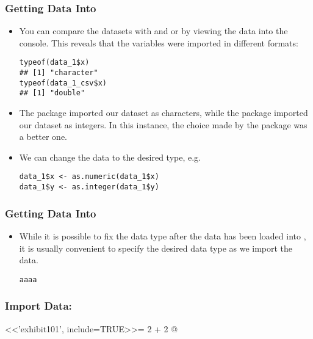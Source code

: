 \begin{frame}[fragile]%
\frametitle{Getting Data Into \Rlogo}
\begin{itemize}
\item You can compare the datasets with  and  or by viewing the data into the console. This reveals that the variables were imported in different formats:
\begin{lstlisting}
typeof(data_1$x)
## [1] "character"
typeof(data_1_csv$x)
## [1] "double"
\end{lstlisting}
\item The  package imported our  dataset as characters, while the  package imported our  dataset as integers. In this instance, the choice made by the  package was a better one. 
\item We can change the data to the desired type, e.g.
\begin{lstlisting}
data_1$x <- as.numeric(data_1$x)
data_1$y <- as.integer(data_1$y)
\end{lstlisting}
\end{itemize}
\end{frame}


\begin{frame}[fragile]%
\frametitle{Getting Data Into \Rlogo}
\begin{itemize}
\item While it is possible to fix the data type after the data has been loaded into \Rlogo, it is usually convenient to specify the desired data type as we import the data. 
\begin{lstlisting}
aaaa
\end{lstlisting}
\end{itemize}
\end{frame}


\begin{frame}[fragile]%
\frametitle{Import Data:}
<<'exhibit101', include=TRUE>>=
  2 + 2
@
\end{frame}

